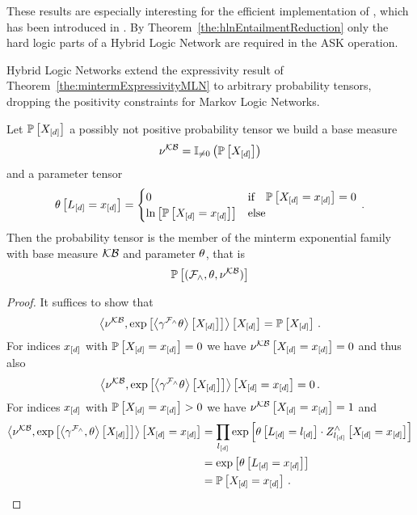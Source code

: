 These results are especially interesting for the efficient implementation of , which has been introduced in .
By Theorem~\ref{the:hlnEntailmentReduction} only the hard logic parts of a Hybrid Logic Network are required in the ASK operation.


Hybrid Logic Networks extend the expressivity result of Theorem~\ref{the:mintermExpressivityMLN} to arbitrary probability tensors, dropping the positivity constraints for Markov Logic Networks.

\begin{theorem}\label{the:mintermExpressivityHLN}
	Let $\mathbb{P}\left[X_{[d]}\right]$ a possibly not positive probability tensor we build a base measure
		\[ \nu^{\mathcal{KB}} = \mathbb{I}_{\neq0}\left(\mathbb{P}\left[X_{[d]}\right]\right) \]
	and a parameter tensor
	\begin{align*}
		\theta\left[L_{[d]}=x_{[d]}\right]
		= \begin{cases}
			0 & \text{if} \quad \mathbb{P}\left[X_{[d]}=x_{[d]}\right] = 0  \\
			\ln \left[ \mathbb{P}\left[X_{[d]}=x_{[d]}\right] \right] & \text{else} 
		\end{cases} \, . 
	\end{align*}
	Then the probability tensor is the member of the minterm exponential family with base measure $\mathcal{KB}$ and parameter $\theta$, that is
		\[ \mathbb{P}\left[(\mathcal{F}_{\land},\theta,\nu^{\mathcal{KB}})\right]\]
\end{theorem}
\begin{proof}
	It suffices to show that 
		\[ \left\langle \nu^{\mathcal{KB}}, \mathrm{exp}\left[\left\langle 
		\gamma^{\mathcal{F}_{\land}}\theta
		\right\rangle \left[ 
		X_{[d]}
		 \right]\right]\right\rangle \left[ X_{[d]} \right] = \mathbb{P}\left[X_{[d]}\right] \, . \]
	For indices $x_{[d]}$ with $\mathbb{P}\left[X_{[d]}=x_{[d]}\right]=0$ we have $\nu^{\mathcal{KB}}\left[X_{[d]}=x_{[d]}\right]=0$ and thus also 
		\[ \left\langle \nu^{\mathcal{KB}}, \mathrm{exp}\left[\left\langle 
		\gamma^{\mathcal{F}_{\land}}\theta
		\right\rangle \left[ 
		X_{[d]}
		 \right]\right]\right\rangle \left[ X_{[d]}=x_{[d]} \right] = 0 \, . \]
	For indices $x_{[d]}$ with $\mathbb{P}\left[X_{[d]}=x_{[d]}\right]>0$ we have $\nu^{\mathcal{KB}}\left[X_{[d]}=x_{[d]}\right]=1$ and
	\begin{align*}
		 \left\langle \nu^{\mathcal{KB}}, \mathrm{exp}\left[\left\langle 
		\gamma^{\mathcal{F}_{\land}},\theta
		\right\rangle \left[ 
		X_{[d]}
		 \right]\right]\right\rangle \left[ X_{[d]}=x_{[d]} \right] 
		&= \prod_{l_{[d]}} \mathrm{exp}\left[\theta\left[L_{[d]}=l_{[d]}\right] \cdot Z^{\land}_{l_{[d]}}\left[X_{[d]}=x_{[d]}\right]\right] \\
		&=  \mathrm{exp}\left[\theta\left[L_{[d]}=x_{[d]}\right]\right] \\
		&=  \mathbb{P}\left[X_{[d]}=x_{[d]}\right] \, .
	\end{align*}
\end{proof}



